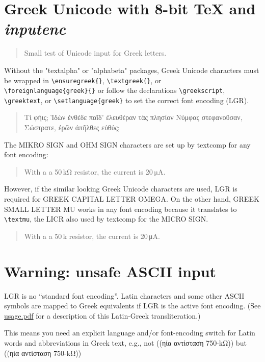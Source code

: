 \documentclass[a4paper]{article}
\begin{document}
\section*{Greek Unicode with 8-bit TeX and \emph{inputenc}}

\begin{abstract}
  Small test of Unicode input for Greek letters.
\end{abstract}

Without the "textalpha" or "alphabeta" packages, Greek Unicode characters
must be wrapped in \verb+\ensuregreek{}+, \verb+\textgreek{}+, or\\
\verb+\foreignlanguage{greek}{}+ or follow the declarations
\verb+\greekscript+, \verb+\greektext+, or \verb+\setlanguage{greek}+ to set
the correct font encoding (LGR).

\begin{quote}
  \greekscript
  Τί φήις; Ἱδὼν ἐνθέδε παῖδ’ ἐλευθέραν
  τὰς πλησίον Νύμφας στεφανοῦσαν, Σώστρατε,
  ἐρῶν άπῆλθες εὐθύς;
\end{quote}

The MIKRO SIGN and OHM SIGN characters are set up by textcomp for
any font encoding:
\begin{quote}
  With a a 50\,kΩ resistor, the current is 20\,µA.
\end{quote}
However, if the similar looking Greek Unicode characters are used, LGR is
required for GREEK CAPITAL LETTER OMEGA. On the other hand, GREEK SMALL
LETTER MU works in any font encoding because it translates to
\verb+\textmu+, the LICR also used by textcomp for the MICRO SIGN.
\begin{quote}
  With a a 50\,k resistor, the current is 20\,μA.
\end{quote}


\section{Warning: unsafe ASCII input}

LGR is no ``standard font encoding''. Latin characters and some other ASCII
symbols are mapped to Greek equivalents if LGR is the active font encoding.
(See
\href{http://mirrors.ctan.org/language/babel/contrib/greek/usage.pdf}{usage.pdf}
for a description of this Latin-Greek transliteration.)

This means you need an explicit language and/or font-encoding switch for
Latin words and abbreviations in Greek text, e.g., not
\foreignlanguage{greek}{((ηία αντίσταση 750-kΩ))} but
\foreignlanguage{greek}{((ηία αντίσταση 750-\textlatin{k}Ω))}
\end{document}
